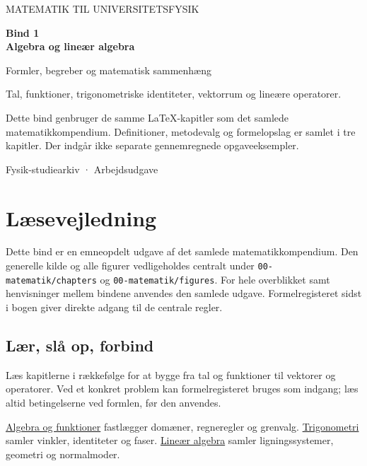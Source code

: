 \documentclass[11pt,a4paper,oneside]{book}
\begin{document}
\frontmatter
\hypersetup{pageanchor=false}
\begin{titlepage}
\centering
\vspace*{30mm}
{\sffamily\color{arkivblaa}\Large MATEMATIK TIL UNIVERSITETSFYSIK\par}
\vspace{16mm}
{\Huge\bfseries Bind 1\\[6mm]Algebra og lineær algebra\par}
\vspace{13mm}
{\Large Formler, begreber og matematisk sammenhæng\par}
\vfill
\begin{minipage}{0.8\textwidth}
Tal, funktioner, trigonometriske identiteter, vektorrum og lineære operatorer.

Dette bind genbruger de samme LaTeX-kapitler som det samlede matematikkompendium. Definitioner, metodevalg og formelopslag er samlet i tre kapitler. Der indgår ikke separate gennemregnede opgaveeksempler.
\end{minipage}\par
\vspace{14mm}
{\small Fysik-studiearkiv · Arbejdsudgave\par}
\end{titlepage}
\hypersetup{pageanchor=true}
\chapter*{Læsevejledning}
Dette bind er en emneopdelt udgave af det samlede matematikkompendium. Den generelle kilde og alle figurer vedligeholdes centralt under \texttt{00-matematik/chapters} og \texttt{00-matematik/figures}. For hele overblikket samt henvisninger mellem bindene anvendes den samlede udgave. Formelregisteret sidst i bogen giver direkte adgang til de centrale regler.
\section*{Lær, slå op, forbind}
Læs kapitlerne i rækkefølge for at bygge fra tal og funktioner til vektorer
og operatorer. Ved et konkret problem kan formelregisteret bruges som
indgang; læs altid betingelserne ved formlen, før den anvendes.

\hyperref[ch:algebra]{Algebra og funktioner} fastlægger domæner,
regneregler og grenvalg. \hyperref[ch:trigonometri]{Trigonometri} samler
vinkler, identiteter og faser. \hyperref[ch:b1-lineaer]{Lineær algebra}
samler ligningssystemer, geometri og normalmoder.
\end{document}
